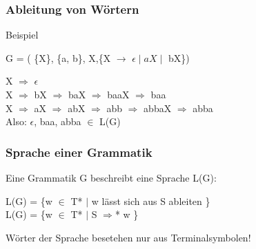 \documentclass{beamer}
\begin{document}
\begin{frame}
	\frametitle{Ableitung von W\"ortern}
	\begin{example}{Beispiel}
		\begin{center}
			G = ( \{X\}, \{a, b\}, X,\{X $\rightarrow$ $\epsilon \mid aX \mid$ bX\})
		\end{center}
		X $\Rightarrow$ $\epsilon$ \\
		X $\Rightarrow$ bX $\Rightarrow$ baX $\Rightarrow$ baaX $\Rightarrow$ baa \\
		X $\Rightarrow$ aX $\Rightarrow$ abX $\Rightarrow$ abb $\Rightarrow$ abbaX $\Rightarrow$ abba \\
		Also: $\epsilon$, baa, abba $\in$ L(G)
	\end{example}
\end{frame}

\begin{frame}
\frametitle{Sprache einer Grammatik}
Eine Grammatik G beschreibt eine Sprache L(G):
\begin{center}
L(G) = \{w $\in$ T* $\mid$ w l\"asst sich aus S ableiten \} \\
L(G) = \{w $\in$ T* $\mid$ S $\Rightarrow$* w \}
\end{center}
W\"orter der Sprache besetehen nur aus Terminalsymbolen!
\end{frame}
\end{document}
